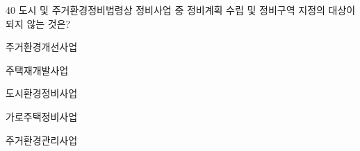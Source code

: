 \begin{question}{40}
도시 및 주거환경정비법령상 정비사업 중 정비계획 수립 및 정비구역 지정의 대상이 되지 않는 것은?
\begin{choices}
  \item 주거환경개선사업
  \item 주택재개발사업
  \item 도시환경정비사업
  \item 가로주택정비사업
  \item 주거환경관리사업
\end{choices}
\end{question}
